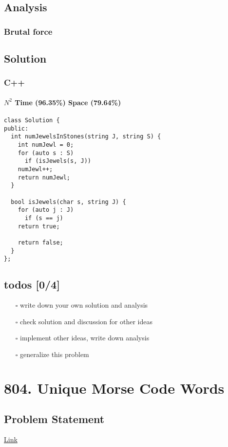 \documentclass[12pt]{article}
\begin{document}
\subsection{Analysis}
\label{sec:org68a9450}
\subsubsection{Brutal force}
\label{sec:org28fc58b}
\subsection{Solution}
\label{sec:orgc8ed98b}
\subsubsection{C++}
\label{sec:org220048c}
\paragraph{\(N^2\) Time (96.35\%) Space (79.64\%)}
\label{sec:org692ca85}
\begin{verbatim}
class Solution {
public:
  int numJewelsInStones(string J, string S) {
    int numJewl = 0;
    for (auto s : S)
      if (isJewels(s, J))
	numJewl++;
    return numJewl;
  }

  bool isJewels(char s, string J) {
    for (auto j : J)
      if (s == j)
	return true;

    return false;
  }
};
\end{verbatim}
\subsection{todos [0/4]}
\label{sec:org89816b1}
\begin{itemize}
\item[{$\square$}] write down your own solution and analysis
\item[{$\square$}] check solution and discussion for other ideas
\item[{$\square$}] implement other ideas, write down analysis
\item[{$\square$}] generalize this problem
\end{itemize}
\section{804. Unique Morse Code Words}
\label{sec:org33d6b3e}
\subsection{Problem Statement}
\label{sec:org8c58414}
\href{https://leetcode.com/problems/unique-morse-code-words/}{Link}
\end{document}
